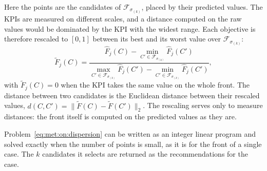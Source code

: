 Here the points are the candidates of $\mathcal{F}_{\sigma_{(k)}}$, placed
by their predicted values. The KPIs are measured on different scales, and a
distance computed on the raw values would be dominated by the KPI with the
widest range. Each objective is therefore rescaled to $[0, 1]$ between its
best and its worst value over $\mathcal{F}_{\sigma_{(k)}}$:
\begin{equation}
  \tilde{F}_j(C) = \frac{\hat{F}_j(C) - \min_{C' \in
  \mathcal{F}_{\sigma_{(k)}}} \hat{F}_j(C')}{\max_{C' \in
  \mathcal{F}_{\sigma_{(k)}}} \hat{F}_j(C') - \min_{C' \in
  \mathcal{F}_{\sigma_{(k)}}} \hat{F}_j(C')},
  \label{eq:met:on:minmax}
\end{equation}
with $\tilde{F}_j(C) = 0$ when the KPI takes the same value on the whole
front. The distance between two candidates is the Euclidean distance between
their rescaled values,
$d(C, C') = \lVert \tilde{F}(C) - \tilde{F}(C') \rVert_2$. The
rescaling serves only to measure distances: the front itself is computed on
the predicted values as they are.

Problem~\eqref{eq:met:on:dispersion} can be written as an integer linear
program and solved exactly when the number of points is small, as it is for
the front of a single case. The $k$ candidates it selects are returned as
the recommendations for the case.

